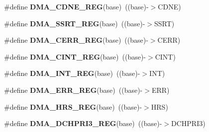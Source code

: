 \begin{DoxyCompactItemize}
\item 
\#define {\bfseries D\+M\+A\+\_\+\+C\+D\+N\+E\+\_\+\+R\+EG}(base)~((base)-\/$>$C\+D\+NE)\hypertarget{group__DMA__Register__Accessor__Macros_ga6c42e04f81a5dde13a21ba5a29e7768a}{}\label{group__DMA__Register__Accessor__Macros_ga6c42e04f81a5dde13a21ba5a29e7768a}

\item 
\#define {\bfseries D\+M\+A\+\_\+\+S\+S\+R\+T\+\_\+\+R\+EG}(base)~((base)-\/$>$S\+S\+RT)\hypertarget{group__DMA__Register__Accessor__Macros_ga9589776b5120c824fe7e4e91887583cb}{}\label{group__DMA__Register__Accessor__Macros_ga9589776b5120c824fe7e4e91887583cb}

\item 
\#define {\bfseries D\+M\+A\+\_\+\+C\+E\+R\+R\+\_\+\+R\+EG}(base)~((base)-\/$>$C\+E\+RR)\hypertarget{group__DMA__Register__Accessor__Macros_ga287b6a85d5d7e1c596cc752bc91effba}{}\label{group__DMA__Register__Accessor__Macros_ga287b6a85d5d7e1c596cc752bc91effba}

\item 
\#define {\bfseries D\+M\+A\+\_\+\+C\+I\+N\+T\+\_\+\+R\+EG}(base)~((base)-\/$>$C\+I\+NT)\hypertarget{group__DMA__Register__Accessor__Macros_ga7a25bacc9e5b0bee2b54320962dcd922}{}\label{group__DMA__Register__Accessor__Macros_ga7a25bacc9e5b0bee2b54320962dcd922}

\item 
\#define {\bfseries D\+M\+A\+\_\+\+I\+N\+T\+\_\+\+R\+EG}(base)~((base)-\/$>$I\+NT)\hypertarget{group__DMA__Register__Accessor__Macros_ga6ea04c1128a280d8ec12d38433e989f7}{}\label{group__DMA__Register__Accessor__Macros_ga6ea04c1128a280d8ec12d38433e989f7}

\item 
\#define {\bfseries D\+M\+A\+\_\+\+E\+R\+R\+\_\+\+R\+EG}(base)~((base)-\/$>$E\+RR)\hypertarget{group__DMA__Register__Accessor__Macros_ga152d6742e7c77d4ef62822bd283d3d29}{}\label{group__DMA__Register__Accessor__Macros_ga152d6742e7c77d4ef62822bd283d3d29}

\item 
\#define {\bfseries D\+M\+A\+\_\+\+H\+R\+S\+\_\+\+R\+EG}(base)~((base)-\/$>$H\+RS)\hypertarget{group__DMA__Register__Accessor__Macros_ga96f169a5241ae368b33d95d1191e0bf4}{}\label{group__DMA__Register__Accessor__Macros_ga96f169a5241ae368b33d95d1191e0bf4}

\item 
\#define {\bfseries D\+M\+A\+\_\+\+D\+C\+H\+P\+R\+I3\+\_\+\+R\+EG}(base)~((base)-\/$>$D\+C\+H\+P\+R\+I3)\hypertarget{group__DMA__Register__Accessor__Macros_ga2bf8a4f6d4a9e3754e4f86278536d8cb}{}\label{group__DMA__Register__Accessor__Macros_ga2bf8a4f6d4a9e3754e4f86278536d8cb}


\end{DoxyCompactItemize}
